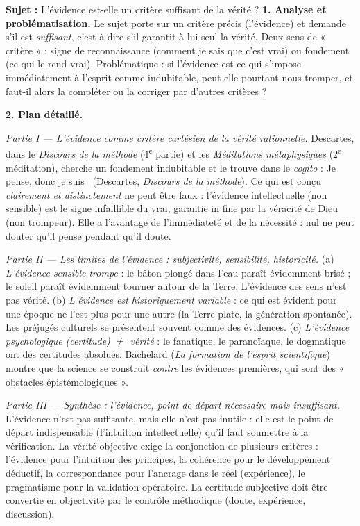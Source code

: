 \documentclass[11pt]{article}
\begin{document}
\begin{exoresolu}
\textbf{Sujet :} L'évidence est-elle un critère suffisant de la vérité ?
\tcblower
\textbf{1. Analyse et problématisation.} Le sujet porte sur un critère précis (l'évidence) et demande s'il est \emph{suffisant}, c'est-à-dire s'il garantit à lui seul la vérité. Deux sens de « critère » : signe de reconnaissance (comment je sais que c'est vrai) ou fondement (ce qui le rend vrai). Problématique : si l'évidence est ce qui s'impose immédiatement à l'esprit comme indubitable, peut-elle pourtant nous tromper, et faut-il alors la compléter ou la corriger par d'autres critères ?

\textbf{2. Plan détaillé.}

\emph{Partie I — L'évidence comme critère cartésien de la vérité rationnelle.} Descartes, dans le \emph{Discours de la méthode} (4\textsuperscript{e} partie) et les \emph{Méditations métaphysiques} (2\textsuperscript{e} méditation), cherche un fondement indubitable et le trouve dans le \emph{cogito} : \guillemotleft Je pense, donc je suis \guillemotright\ (Descartes, \emph{Discours de la méthode}). Ce qui est conçu \emph{clairement et distinctement} ne peut être faux : l'évidence intellectuelle (non sensible) est le signe infaillible du vrai, garantie in fine par la véracité de Dieu (non trompeur). Elle a l'avantage de l'immédiateté et de la nécessité : nul ne peut douter qu'il pense pendant qu'il doute.

\emph{Partie II — Les limites de l'évidence : subjectivité, sensibilité, historicité.} (a) \emph{L'évidence sensible trompe} : le bâton plongé dans l'eau paraît évidemment brisé ; le soleil paraît évidemment tourner autour de la Terre. L'évidence des sens n'est pas vérité. (b) \emph{L'évidence est historiquement variable} : ce qui est évident pour une époque ne l'est plus pour une autre (la Terre plate, la génération spontanée). Les préjugés culturels se présentent souvent comme des évidences. (c) \emph{L'évidence psychologique (certitude) $\neq$ vérité} : le fanatique, le paranoïaque, le dogmatique ont des certitudes absolues. Bachelard (\emph{La formation de l'esprit scientifique}) montre que la science se construit \emph{contre} les évidences premières, qui sont des « obstacles épistémologiques ».

\emph{Partie III — Synthèse : l'évidence, point de départ nécessaire mais insuffisant.} L'évidence n'est pas suffisante, mais elle n'est pas inutile : elle est le point de départ indispensable (l'intuition intellectuelle) qu'il faut soumettre à la vérification. La vérité objective exige la conjonction de plusieurs critères : l'évidence pour l'intuition des principes, la cohérence pour le développement déductif, la correspondance pour l'ancrage dans le réel (expérience), le pragmatisme pour la validation opératoire. La certitude subjective doit être convertie en objectivité par le contrôle méthodique (doute, expérience, discussion).


\end{exoresolu}
\end{document}
